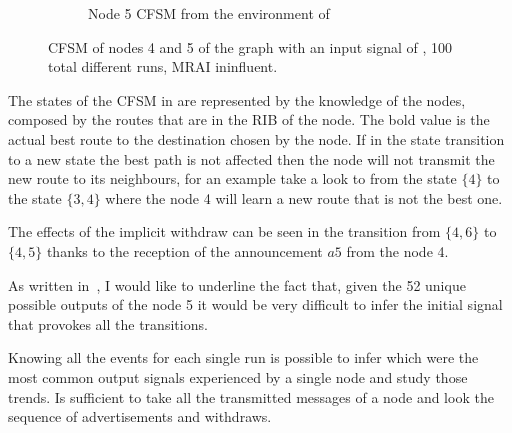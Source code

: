 \begin{figure}[h]
\begin{subfigure}[b]{0.49\textwidth}
		 \caption{Node \num{5} \ac{CFSM} from the environment of }
         \label{fig:fsm_node5}
     \end{subfigure}
		\caption{\ac{CFSM} of nodes \num{4} and \num{5} of the graph
			 with an input signal of ,
			\num{100} total different runs, \ac{MRAI} ininfluent.
			}
        \label{fig:fsm_griffin_fig4}
\end{figure}

The states of the \ac{CFSM} in  are represented by the
knowledge of the nodes, composed by the routes that are in the \ac{RIB} of the node.
The bold value is the actual best route to the destination chosen by the node.
If in the state transition to a new state the best path is not affected then the
node will not transmit the new route to its neighbours, for an example take
a look to  from the state $\{4\}$ to the state $\{3, 4\}$
where the node \num{4} will learn a new route that is not the best one.

The effects of the implicit withdraw can be seen in 
the transition from $\{4, 6\}$ to $\{4, 5\}$ thanks to the reception of the
announcement $a5$ from the node \num{4}.

As written in~\cite{griffinFSM}, I would like to underline the fact that, given
the \num{52} unique possible outputs of the node \num{5} it would be very difficult
to infer the initial signal that provokes all the transitions.

Knowing all the events for each single run is possible to infer which were the
most common output signals experienced by a single node  and study those trends.
Is sufficient to take all the transmitted messages of a node and look the sequence
of advertisements and withdraws.

